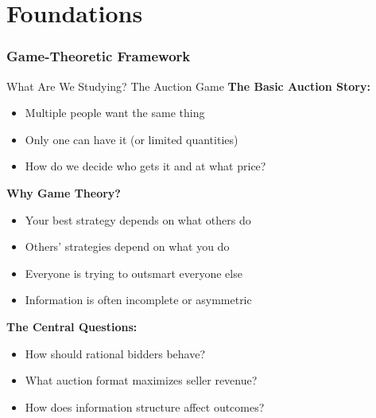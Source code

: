 \documentclass[xcolor={x11names}, aspectratio=169 ]{beamer}
\begin{document}
\part{Foundations}
\section{Game-Theoretic Framework}

\begin{frame}{What Are We Studying? The Auction Game}
\textbf{The Basic Auction Story:}
\begin{itemize}
  \item Multiple people want the same thing
  \item Only one can have it (or limited quantities)
  \item How do we decide who gets it and at what price?
\end{itemize}

\textbf{Why Game Theory?}
\begin{itemize}
  \item Your best strategy depends on what others do
  \item Others' strategies depend on what you do
  \item Everyone is trying to outsmart everyone else
  \item Information is often incomplete or asymmetric
\end{itemize}

\textbf{The Central Questions:}
\begin{itemize}
  \item How should rational bidders behave?
  \item What auction format maximizes seller revenue?
  \item How does information structure affect outcomes?
\end{itemize}
\end{frame}
\end{document}
